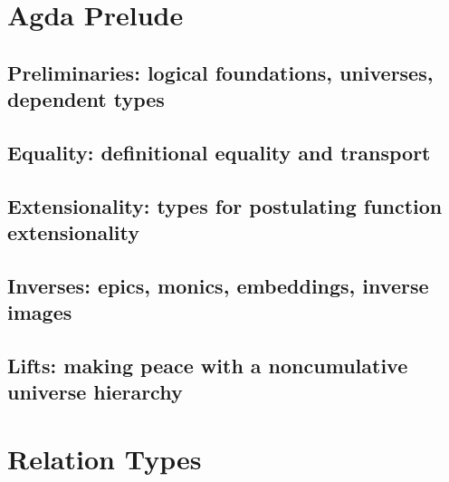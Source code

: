 \documentclass[a4paper,UKenglish,cleveref,autoref,thm-restate,12pt]{../lipics-v2021-wjd}
\begin{document}
\section{Agda Prelude}\label{sec:agda-prelude}

\subsection{Preliminaries: logical foundations, universes, dependent types}\label{preliminaries}


\subsection{Equality: definitional equality and transport}\label{equality}


\subsection{Extensionality: types for postulating function extensionality}\label{function-extensionality}


\subsection{Inverses: epics, monics, embeddings, inverse images}\label{sec:inverse-image-invers}


\subsection{Lifts: making peace with a noncumulative universe hierarchy}\label{sec:lifts-altern-univ}





\section{Relation Types}\label{sec:relat-quot-types}
\end{document}
